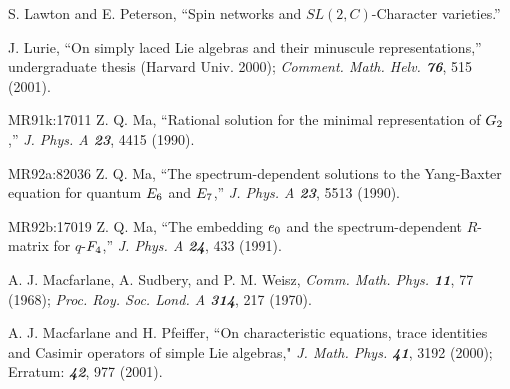 
 S. Lawton and E. Peterson,
        ``Spin networks and $SL(2,C)$-Character varieties.''

%

 J. Lurie,   %
    ``On simply laced Lie algebras and
    their minuscule representations,''
    undergraduate thesis (Harvard Univ. 2000);
    {\em Comment. Math. Helv. \bf 76},  515 (2001). %




        {MR91k:17011} Z. Q. Ma,
``Rational solution for the minimal representation of $G\sb 2$,''
{\em J. Phys. A  \bf 23}, 4415 (1990).

        {MR92a:82036} Z. Q. Ma,
``The spectrum-dependent solutions to the Yang-Baxter
  equation for quantum $E\sb 6$ and $E\sb 7$,''
{\em J. Phys. A  \bf 23}, 5513 (1990).

        {MR92b:17019} Z. Q. Ma,
``The embedding $e\sb 0$ and the spectrum-dependent
  $R$-matrix for $q$-$F\sb 4$,''
{\em J. Phys. A  \bf 24}, 433 (1991).

 A. J. Macfarlane, A. Sudbery, and P. M. Weisz,
    {\em Comm. Math. Phys.  \bf 11}, 77 (1968);
    {\em Proc. Roy. Soc. Lond.  A \bf 314}, 217 (1970).

%
 A. J.  Macfarlane and H. Pfeiffer,
    ``On characteristic equations, trace identities
  and Casimir operators of simple Lie algebras,"
  {\em J. Math. Phys. \bf 41}, 3192 (2000); %
  Erratum: {\em \bf 42}, 977 (2001).

